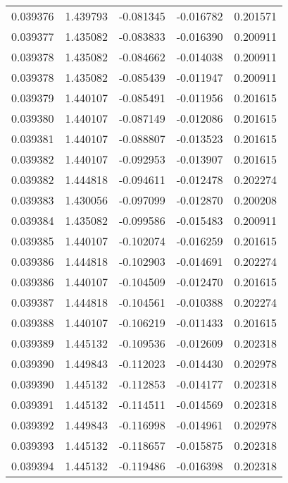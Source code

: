 \begin{tabular}{lrrrr}
0.039376    &  1.439793 & -0.081345 & -0.016782 &             0.201571 \\
0.039377    &  1.435082 & -0.083833 & -0.016390 &             0.200911 \\
0.039378    &  1.435082 & -0.084662 & -0.014038 &             0.200911 \\
0.039378    &  1.435082 & -0.085439 & -0.011947 &             0.200911 \\
0.039379    &  1.440107 & -0.085491 & -0.011956 &             0.201615 \\
0.039380    &  1.440107 & -0.087149 & -0.012086 &             0.201615 \\
0.039381    &  1.440107 & -0.088807 & -0.013523 &             0.201615 \\
0.039382    &  1.440107 & -0.092953 & -0.013907 &             0.201615 \\
0.039382    &  1.444818 & -0.094611 & -0.012478 &             0.202274 \\
0.039383    &  1.430056 & -0.097099 & -0.012870 &             0.200208 \\
0.039384    &  1.435082 & -0.099586 & -0.015483 &             0.200911 \\
0.039385    &  1.440107 & -0.102074 & -0.016259 &             0.201615 \\
0.039386    &  1.444818 & -0.102903 & -0.014691 &             0.202274 \\
0.039386    &  1.440107 & -0.104509 & -0.012470 &             0.201615 \\
0.039387    &  1.444818 & -0.104561 & -0.010388 &             0.202274 \\
0.039388    &  1.440107 & -0.106219 & -0.011433 &             0.201615 \\
0.039389    &  1.445132 & -0.109536 & -0.012609 &             0.202318 \\
0.039390    &  1.449843 & -0.112023 & -0.014430 &             0.202978 \\
0.039390    &  1.445132 & -0.112853 & -0.014177 &             0.202318 \\
0.039391    &  1.445132 & -0.114511 & -0.014569 &             0.202318 \\
0.039392    &  1.449843 & -0.116998 & -0.014961 &             0.202978 \\
0.039393    &  1.445132 & -0.118657 & -0.015875 &             0.202318 \\
0.039394    &  1.445132 & -0.119486 & -0.016398 &             0.202318 \\

\end{tabular}
